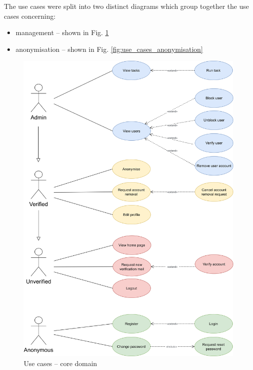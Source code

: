 \documentclass[a4paper,twoside,12pt]{book}
\begin{document}
The use cases were split into two distinct diagrams which group together the use cases concerning:
\begin{itemize}
\item management – shown in Fig. \ref{fig:use_cases_management}
\item anonymisation – shown in Fig. \ref{fig:use_cases_anonymisation} 
\end{itemize}

\begin{figure}
  \centering
  \includegraphics[width=\linewidth]{img/use_cases_core.png}
  \caption{Use cases – core domain}
  \label{fig:use_cases_management}
\end{figure}
\end{document}
